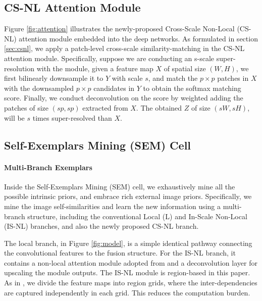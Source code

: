 \documentclass[10pt,twocolumn,letterpaper]{article}
\begin{document}
\subsection{CS-NL Attention Module}

Figure \ref{fig:attention} illustrates the newly-proposed Cross-Scale Non-Local (CS-NL) attention module embedded into the deep networks. As formulated in section \ref{sec:csnl}, we apply a patch-level cross-scale similarity-matching in the CS-NL attention module. Specifically, suppose we are conducting an s-scale super-resolution with the module, given a feature map $X$ of spatial size $(W, H)$, we first bilinearly downsample it to $Y$ with scale $s$, and match the $p \times p$ patches in $X$ with the downsampled $p \times p$ candidates in $Y$ to obtain the softmax matching score. Finally, we conduct deconvolution on the score by weighted adding the patches of size $(sp, sp)$ extracted from $X$. The obtained $Z$ of size $(sW, sH)$, will be $s$ times super-resolved than $X$. \subsection{Self-Exemplars Mining (SEM) Cell}

\paragraph{Multi-Branch Exemplars}
Inside the Self-Exemplars Mining (SEM) cell, we exhaustively mine all the possible intrinsic priors, and embrace rich external image priors. Specifically, we mine the image self-similarities and learn the new information using a multi-branch structure, including the conventional Local (L) and In-Scale Non-Local (IS-NL) branches, and also the newly proposed CS-NL branch.  

The local branch, in Figure \ref{fig:model}, is a simple identical pathway connecting the convolutional features to the fusion structure. For the IS-NL branch, it contains a non-local attention module adopted from \cite{dai2019second} and a deconvolution layer for upscaling the module outputs. The IS-NL module is region-based in this paper. As in \cite{dai2019second}, we divide the feature maps into region grids, where the inter-dependencies are captured independently in each grid. This reduces the computation burden. 
\end{document}
